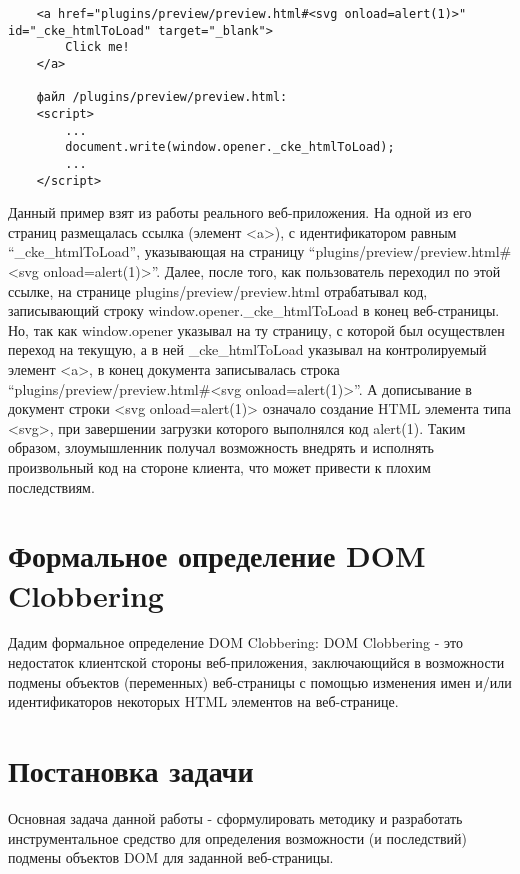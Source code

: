 \begin{lstlisting}
	<a href="plugins/preview/preview.html#<svg onload=alert(1)>" id="_cke_htmlToLoad" target="_blank">
		Click me!
	</a>

	файл /plugins/preview/preview.html:
	<script>
		...
		document.write(window.opener._cke_htmlToLoad);
		...
	</script>
\end{lstlisting}
\bigskip


Данный пример взят из работы реального веб-приложения. На одной из его страниц размещалась ссылка (элемент <a>), с идентификатором равным \\
“\_cke\_htmlToLoad”, указывающая на страницу “plugins/preview/preview.html\#<svg onload=alert(1)>”. Далее, после того, как пользователь переходил по этой ссылке, на странице plugins/preview/preview.html отрабатывал код, записывающий строку window.opener.\_cke\_htmlToLoad в конец веб-страницы. Но, так как window.opener указывал на ту страницу, с которой был осуществлен переход на текущую, а в ней \_cke\_htmlToLoad указывал на контролируемый элемент <a>, в конец документа записывалась строка “plugins/preview/preview.html\#<svg onload=alert(1)>”. А дописывание в документ строки <svg onload=alert(1)> означало создание HTML элемента типа <svg>, при завершении загрузки которого выполнялся код alert(1).
Таким образом, злоумышленник получал возможность внедрять и исполнять произвольный код на стороне клиента, что может привести к плохим последствиям.

\section{Формальное определение DOM Clobbering}

Дадим формальное определение DOM Clobbering: DOM Clobbering - это недостаток клиентской стороны веб-приложения, заключающийся в возможности подмены объектов (переменных) веб-страницы с помощью изменения имен и/или идентификаторов некоторых HTML элементов на веб-странице.

\section{Постановка задачи}
Основная задача данной работы - сформулировать методику и разработать инструментальное средство для определения возможности (и последствий) подмены объектов DOM для заданной веб-страницы.